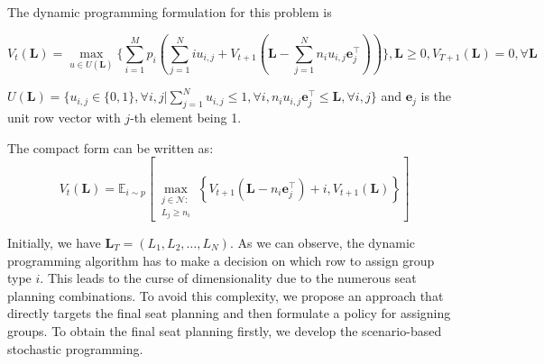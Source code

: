
The dynamic programming formulation for this problem is

$$V_{t}(\mathbf{L}) = \max_{u \in U(\mathbf{L})}\{ \sum_{i=1}^{M} p_i ( \sum_{j=1}^{N} i u_{i,j} + V_{t+1}(\mathbf{L}- \sum_{j=1}^{N} n_i u_{i,j}\mathbf{e}_j^{\top} ))\}, \mathbf{L} \geq 0, V_{T+1}(\mathbf{L}) =0, \forall \mathbf{L}$$


$U(\mathbf{L}) = \{u_{i,j} \in\{0,1\}, \forall i,j| \sum_{j=1}^{N} u_{i,j} \leq 1, \forall i, n_{i}u_{i,j}\mathbf{e}_j^{\top} \leq \mathbf{L}, \forall i,j \}$ and $\mathbf{e}_j$ is the unit row vector with $j$-th element being 1.

The compact form can be written as:
$$V_{t}(\mathbf{L}) = \mathbb{E}_{i \sim p}\left[\max_{\substack{j \in \mathcal{N}: \\ L_j \geqslant n_{i}}}\left\{V_{t+1}\left(\mathbf{L}- n_{i}\mathbf{e}_j^{\top} \right)+ i, V_{t+1}(\mathbf{L})\right\}\right]$$


Initially, we have $\mathbf{L}_{T} = (L_1, L_2, \ldots, L_{N})$. As we can observe, the dynamic programming algorithm has to make a decision on which row to assign group type $i$. This leads to the curse of dimensionality due to the numerous seat planning combinations. To avoid this complexity, we propose an approach that directly targets the final seat planning and then formulate a policy for assigning groups. To obtain the final seat planning firstly, we develop the scenario-based stochastic programming.








